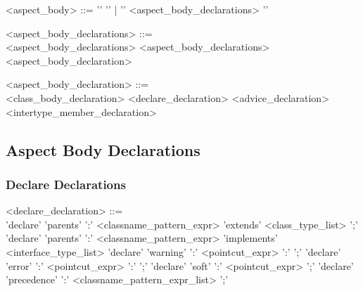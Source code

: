 \begin{minipage}{6in}
\begin{blue}
\begin{grammar}
<aspect_body> ::= '{' '}' | '{' <aspect_body_declarations> '}'

<aspect_body_declarations> ::= \hspace{1in} \\
                  <aspect_body_declarations> 
          \alt    <aspect_body_declarations> <aspect_body_declaration>

<aspect_body_declaration> ::= \hspace{1in} \\
                  {\red <class_body_declaration>}
          \alt    <declare_declaration>
          \alt    <advice_declaration>
          \alt    <intertype_member_declaration>
\end{grammar}
\end{blue}
\end{minipage}

\subsection{Aspect Body Declarations}

\subsubsection{Declare Declarations}

\begin{minipage}{6in}
\begin{blue}
\begin{grammar}
<declare_declaration> ::= \hspace{1in} \\
       'declare' 'parents' ':' {\blue <classname_pattern_expr>} 'extends' 
           {\red <class_type_list>} ';' 
\alt   'declare' 'parents' ':' {\blue <classname_pattern_expr>} 'implements'
           {\red <interface_type_list>}
\alt   'declare' 'warning' ':' {\blue <pointcut_expr>} ':'
                                            {} ';'
\alt   'declare' 'error' ':' {\blue <pointcut_expr>} ':' 
                                            {} ';'
\alt   'declare' 'soft' ':' {\blue <pointcut_expr>} ';'
\alt   'declare' 'precedence' ':' {\blue <classname_pattern_expr_list>} ';'
\end{grammar}
\end{blue}
\end{minipage}

